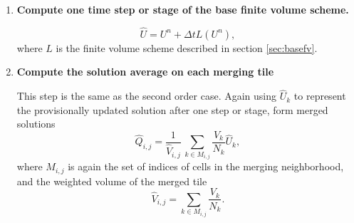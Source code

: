 \begin{enumerate}
\item
{\bf Compute one time step or stage of the base finite volume scheme.}  

$$
\widehat{U} = U^n + \Delta t L(U^n),
$$
where $L$ is the finite volume scheme described in section \ref{sec:basefv}.
\item 
\textbf{Compute the solution average on each merging tile}

This step is the same as the second order case.
Again using $\hat{U}_k$ to represent the provisionally updated 
solution after one step or stage, form merged solutions 
\begin{equation}\label{eq:q_avg1}
     \widehat{Q}_{i,j} =  \frac{1}{ \hat{V}_{i,j}} \,  \sum_{k \in M_{i,j} }\frac{V_{k}}{N_{k}} \hat{U}_{k},
\end{equation}
\noindent where $M_{i,j}$ is again the set of indices of cells in the 
merging neighborhood, and the weighted volume of the merged tile 
\begin{equation}\label{eq:modV}
\hat{V}_{i,j} = \sum_{k \in M_{i,j} }\frac{V_{k}}{N_{k}} .
\end{equation}


\end{enumerate}
